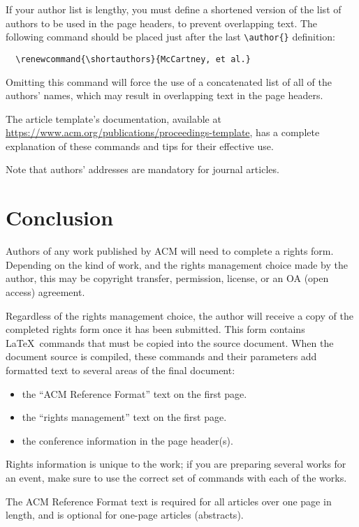 \documentclass[sigconf,natbib=false]{acmart}
\begin{document}
If your author list is lengthy, you must define a shortened version of
the list of authors to be used in the page headers, to prevent
overlapping text. The following command should be placed just after
the last \verb|\author{}| definition:
\begin{verbatim}
  \renewcommand{\shortauthors}{McCartney, et al.}
\end{verbatim}
Omitting this command will force the use of a concatenated list of all
of the authors' names, which may result in overlapping text in the
page headers.

The article template's documentation, available at
\url{https://www.acm.org/publications/proceedings-template}, has a
complete explanation of these commands and tips for their effective
use.

Note that authors' addresses are mandatory for journal articles.

\section{Conclusion}

Authors of any work published by ACM will need to complete a rights
form. Depending on the kind of work, and the rights management choice
made by the author, this may be copyright transfer, permission,
license, or an OA (open access) agreement.

Regardless of the rights management choice, the author will receive a
copy of the completed rights form once it has been submitted. This
form contains \LaTeX\ commands that must be copied into the source
document. When the document source is compiled, these commands and
their parameters add formatted text to several areas of the final
document:
\begin{itemize}
\item the ``ACM Reference Format'' text on the first page.
\item the ``rights management'' text on the first page.
\item the conference information in the page header(s).
\end{itemize}

Rights information is unique to the work; if you are preparing several
works for an event, make sure to use the correct set of commands with
each of the works.

The ACM Reference Format text is required for all articles over one
page in length, and is optional for one-page articles (abstracts).
\end{document}
